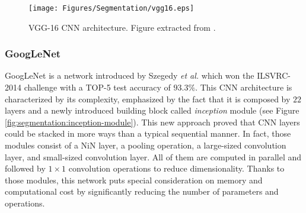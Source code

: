 \begin{figure}[!hbt]
	\centering
	\texttt{[image: Figures/Segmentation/vgg16.eps]}
    \caption{\acs{VGG}-16 \acs{CNN} architecture. Figure extracted from \cite{Noh2015}.}
	\label{fig:segmentation:vgg16}
\end{figure}

\subsubsection{GoogLeNet}

GoogLeNet is a network introduced by Szegedy \emph{et al.} \cite{Szegedy2015} which won the \ac{ILSVRC}-2014 challenge with a TOP-5 test accuracy of $93.3\%$. This \acs{CNN} architecture is characterized by its complexity, emphasized by the fact that it is composed by $22$ layers and a newly introduced building block called \emph{inception} module (see Figure \ref{fig:segmentation:inception-module}). This new approach proved that \acs{CNN} layers could be stacked in more ways than a typical sequential manner. In fact, those modules consist of a \ac{NiN} layer, a pooling operation, a large-sized convolution layer, and small-sized convolution layer. All of them are computed in parallel and followed by $1\times1$ convolution operations to reduce dimensionality. Thanks to those modules, this network puts special consideration on memory and computational cost by significantly reducing the number of parameters and operations.

